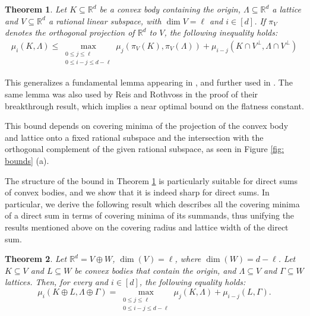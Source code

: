 \documentclass{amsart}
\newtheorem{theorem}{Theorem}[section]
\theoremstyle{definition}
\theoremstyle{remark}
\newcommand{\R}{\mathbb{R}}
\begin{document}
\begin{theorem}\label{thm: ub proj}
Let $K\subseteq\R^d$ be a convex body containing the origin, $\Lambda\subseteq \R^d$ a lattice and $V\subseteq \R^d$ a rational linear subspace, with $\dim V=\ell$ and $i\in[d]$. If $\pi_V$ denotes the orthogonal projection of $\R^d$ to $V$, the following inequality holds:
\begin{align}\label{eq:ub proj}
\mu_i(K, \Lambda)\leqslant \max_{\substack{0 \le j \le \ell \\ 0 \le i-j \le d-\ell}} \mu_j(\pi_V(K), \pi_V(\Lambda))+ \mu_{i-j}(K\cap V^\perp, \Lambda \cap V^\perp)
\end{align}
\end{theorem}
This generalizes a fundamental lemma appearing in \cite{CodenottiSantosSchymura}, and further used in \cite{MalikiosisSantosSchymura}. The same lemma was also used by Reis and Rothvoss \cite{ReisRothvoss} in the proof of their breakthrough result, which implies a near optimal bound on the flatness constant.

This bound depends on covering minima of the projection of the convex body and lattice onto a fixed rational subspace and the intersection with the orthogonal complement of the given rational subspace, as seen in Figure \ref{fig: bounds} (a).

The structure of the bound in Theorem \ref{thm: ub proj} is particularly suitable for direct sums of convex bodies, and we show that it is indeed sharp for direct sums. In particular, we derive the following result which describes all the covering minima of a direct sum in terms of covering minima of its summands, thus unifying the results mentioned above on the covering radius and lattice width of the direct sum.

\begin{theorem}\label{thm: direct sum}
Let $\R^d=V\oplus W$, $\dim(V)=\ell$, where $\dim(W)=d-\ell$. Let $K\subseteq V$ and $L\subseteq W$ be convex bodies that contain the origin, and $\Lambda \subseteq V$ and $\Gamma \subseteq W$ lattices. 
Then, for every and $i\in [d]$, the following equality holds:
 $$\mu_i(K\oplus L, \Lambda\oplus\Gamma)=\max_{\substack{0 \le j \le \ell \\ 0 \le i-j \le d-\ell}} \mu_j(K, \Lambda)+\mu_{i-j}(L,\Gamma).$$
\end{theorem}
\end{document}
